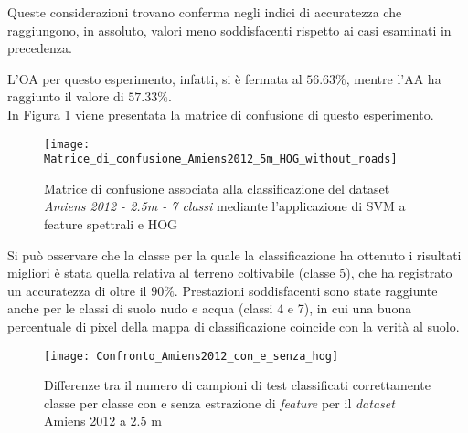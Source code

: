 Queste considerazioni trovano conferma negli indici di accuratezza che
raggiungono, in assoluto, valori meno soddisfacenti rispetto ai casi
esaminati in precedenza.

L'OA per questo esperimento, infatti, si è fermata al $56.63\%$,
mentre l'AA ha raggiunto il valore di $57.33\%$.\\

In Figura \ref{fig:Matrice_di_confusione_Amiens2012_5m_HOG_without_roads}
viene presentata la matrice di confusione di questo esperimento. \\

\begin{figure}[!ht]

\texttt{[image: Matrice\_di\_confusione\_Amiens2012\_5m\_HOG\_without\_roads]}

\caption{Matrice di confusione associata alla classificazione del
dataset \emph{Amiens 2012 - 2.5m - 7 classi} mediante l'applicazione di SVM a feature spettrali e HOG}

\label{fig:Matrice_di_confusione_Amiens2012_5m_HOG_without_roads}
\end{figure}

Si può osservare che la classe per la quale la classificazione ha
ottenuto i risultati migliori è stata quella relativa al terreno
coltivabile (classe 5), che ha registrato un accuratezza di oltre il $90\%$.
Prestazioni soddisfacenti sono state raggiunte anche per le classi di
suolo nudo e acqua (classi 4 e 7), in cui una buona percentuale di
pixel della mappa di classificazione coincide con la verità al
suolo.\\

%
%
%
%
%
%
%

\begin{figure}[!ht]

\texttt{[image: Confronto\_Amiens2012\_con\_e\_senza\_hog]}

\caption{Differenze tra il numero di campioni di test classificati correttamente classe per classe con e
senza estrazione di \emph{feature} per il \emph{dataset} Amiens 2012 a
$2.5$ m}

\label{fig:Confronto_Amiens2012_2.5m}

\end{figure}

